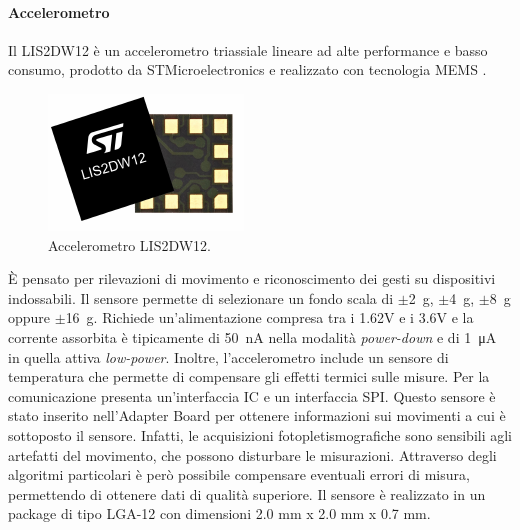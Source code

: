 \paragraph{Accelerometro} Il LIS2DW12 è un accelerometro triassiale lineare ad alte performance e basso consumo, prodotto da STMicroelectronics\cite{STElectronicsLIS2DW12} e realizzato con tecnologia MEMS . 
\begin{figure}[b]
	\centering
	\includegraphics[width=0.3\linewidth]{ImageFiles/Hardware/ImmagineLIS2DW12}
	\caption{Accelerometro LIS2DW12.}
	\label{fig:ImmagineLIS2DW12}
\end{figure}
\`E pensato per rilevazioni di movimento e riconoscimento dei gesti su dispositivi indossabili. Il sensore permette di selezionare un fondo scala di $\pm$\SI{2}{\gram}, $\pm$\SI{4}{\gram}, $\pm$\SI{8}{\gram} oppure $\pm$\SI{16}{\gram}. Richiede un'alimentazione compresa tra i 1.62V e i 3.6V e la corrente assorbita è tipicamente di \SI{50}{\nano\ampere} nella modalità \textit{power-down} e di \SI{1}{\micro\ampere} in quella attiva \textit{low-power}. Inoltre, l'accelerometro include un sensore di temperatura che permette di compensare gli effetti termici sulle misure. Per la comunicazione presenta un'interfaccia IC e un interfaccia SPI. Questo sensore è stato inserito nell'Adapter Board per ottenere informazioni sui movimenti a cui è sottoposto il sensore. Infatti, le acquisizioni fotopletismografiche sono sensibili agli artefatti del movimento, che possono disturbare le misurazioni. Attraverso degli algoritmi particolari è però possibile compensare eventuali errori di misura, permettendo di ottenere dati di qualità superiore. Il sensore è realizzato in un package di tipo LGA-12 con dimensioni 2.0 mm x 2.0 mm x 0.7 mm.

